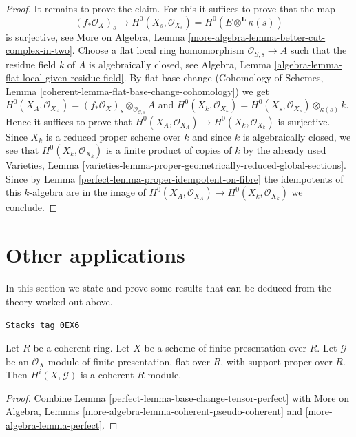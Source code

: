 \begin{proof}
\medskip\noindent
It remains to prove the claim. For this it suffices to prove that the map
$$
(f_*\mathcal{O}_X)_s
\longrightarrow
H^0(X_s, \mathcal{O}_{X_s}) = H^0(E \otimes^\mathbf{L} \kappa(s))
$$
is surjective, see
More on Algebra, Lemma \ref{more-algebra-lemma-better-cut-complex-in-two}.
Choose a flat local ring homomorphism $\mathcal{O}_{S, s} \to A$
such that the residue field $k$ of $A$ is algebraically closed, see
Algebra, Lemma \ref{algebra-lemma-flat-local-given-residue-field}.
By flat base change (Cohomology of Schemes, Lemma
\ref{coherent-lemma-flat-base-change-cohomology})
we get $H^0(X_A, \mathcal{O}_{X_A}) =
(f_*\mathcal{O}_X)_s \otimes_{\mathcal{O}_{S, s}} A$
and $H^0(X_k, \mathcal{O}_{X_k}) =
H^0(X_s, \mathcal{O}_{X_s}) \otimes_{\kappa(s)} k$.
Hence it suffices to prove that
$H^0(X_A, \mathcal{O}_{X_A}) \to H^0(X_k, \mathcal{O}_{X_k})$
is surjective. Since $X_k$ is a reduced proper scheme over $k$
and since $k$ is algebraically closed, we see that
$H^0(X_k, \mathcal{O}_{X_k})$ is a finite product of copies
of $k$ by the already used Varieties, Lemma
\ref{varieties-lemma-proper-geometrically-reduced-global-sections}.
Since by Lemma \ref{perfect-lemma-proper-idempotent-on-fibre}
the idempotents of this $k$-algebra are in the image
of $H^0(X_A, \mathcal{O}_{X_A}) \to H^0(X_k, \mathcal{O}_{X_k})$ we conclude.
\end{proof}

\section{Other applications}
\label{perfect-section-other-applications}
In this section we state and prove some results that can be deduced
from the theory worked out above.

\begin{lemma}
\label{perfect-lemma-cohomology-over-coherent-ring}
\href{https://stacks.math.columbia.edu/tag/0EX6}{\texttt{Stacks tag 0EX6}}

Let $R$ be a coherent ring. Let $X$ be a scheme of finite presentation over $R$.
Let $\mathcal{G}$ be an $\mathcal{O}_X$-module of finite presentation,
flat over $R$, with support proper over $R$. Then
$H^i(X, \mathcal{G})$ is a coherent $R$-module.
\end{lemma}

\begin{proof}

Combine Lemma \ref{perfect-lemma-base-change-tensor-perfect} with
More on Algebra, Lemmas \ref{more-algebra-lemma-coherent-pseudo-coherent} and
\ref{more-algebra-lemma-perfect}.
\end{proof}

